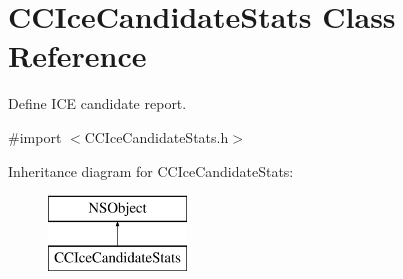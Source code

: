 \hypertarget{interface_c_c_ice_candidate_stats}{}\section{C\+C\+Ice\+Candidate\+Stats Class Reference}
\label{interface_c_c_ice_candidate_stats}


Define I\+CE candidate report.  




{\ttfamily \#import $<$C\+C\+Ice\+Candidate\+Stats.\+h$>$}

Inheritance diagram for C\+C\+Ice\+Candidate\+Stats\+:\begin{figure}[H]
\begin{center}
\leavevmode
\includegraphics[height=2.000000cm]{interface_c_c_ice_candidate_stats}
\end{center}
\end{figure}
